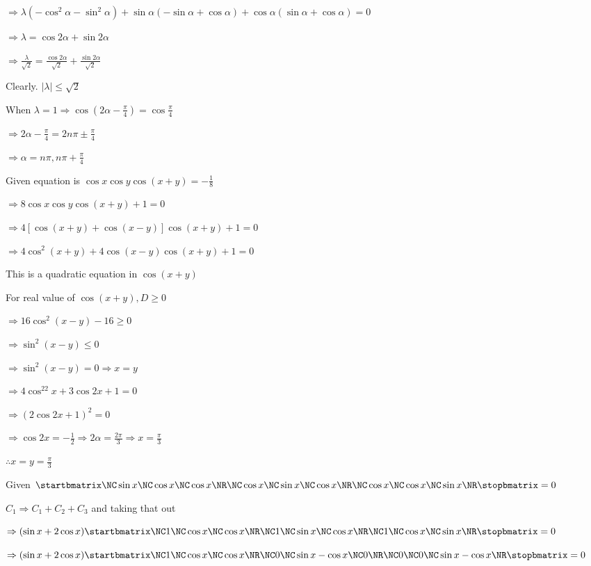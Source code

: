   $\Rightarrow \lambda(-\cos^2\alpha - \sin^2\alpha) + \sin\alpha(-\sin\alpha + \cos\alpha) + \cos\alpha(\sin\alpha +
  \cos\alpha) = 0$

  $\Rightarrow \lambda = \cos2\alpha + \sin2\alpha$

  $\Rightarrow \frac{\lambda}{\sqrt{2}} = \frac{\cos2\alpha}{\sqrt{2}} + \frac{\sin2\alpha}{\sqrt{2}}$

  Clearly. $|\lambda| \leq \sqrt{2}$

  When $\lambda = 1\Rightarrow \cos\left(2\alpha - \frac{\pi}{4}\right) = \cos\frac{\pi}{4}$

  $\Rightarrow 2\alpha - \frac{\pi}{4} = 2n\pi\pm\frac{\pi}{4}$

  $\Rightarrow \alpha = n\pi, n\pi + \frac{\pi}{4}$

\item Given equation is $\cos x \cos y\cos(x + y) = -\frac{1}{8}$

  $\Rightarrow 8\cos x\cos y\cos(x + y) + 1 = 0$

  $\Rightarrow 4[\cos(x + y) + \cos(x - y)]\cos(x + y) + 1 = 0$

  $\Rightarrow 4\cos^2(x + y) + 4\cos(x - y)\cos(x + y) + 1 = 0$

  This is a quadratic equation in $\cos(x + y)$

  For real value of $\cos(x + y), D\geq 0$

  $\Rightarrow 16\cos^2(x - y) - 16\geq0$

  $\Rightarrow \sin^2(x - y)\leq 0$

  $\Rightarrow \sin^2(x - y) = 0 \Rightarrow x = y$

  $\Rightarrow 4\cos^22x + 3\cos2x + 1 = 0$

  $\Rightarrow (2\cos2x + 1)^2 = 0$

  $\Rightarrow \cos2x = -\frac{1}{2} \Rightarrow 2\alpha = \frac{2\pi}{3}\Rightarrow x = \frac{\pi}{3}$

  $\therefore x = y = \frac{\pi}{3}$

\item Given $\startbmatrix\NC\sin x\NC \cos x \NC \cos x \NR\NC\cos x \NC \sin x \NC \cos x\NR\NC\cos x \NC \cos x \NC \sin x\NR\stopbmatrix = 0$

  $C_1\Rightarrow C_1 + C_2 + C_3$ and taking that out

  $\Rightarrow (\sin x + 2\cos x)\startbmatrix\NC1 \NC \cos x \NC \cos x\NR\NC1\NC\sin x\NC \cos x\NR\NC1\NC\cos x\NC\sin x\NR\stopbmatrix = 0$

  $\Rightarrow (\sin x + 2\cos x)\startbmatrix\NC1 \NC \cos x \NC \cos x\NR\NC0 \NC \sin x - \cos x \NC 0\NR\NC0 \NC 0 \NC \sin x - \cos
  x\NR\stopbmatrix = 0$

